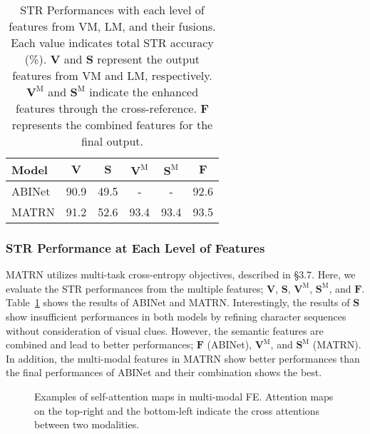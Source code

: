 \documentclass[runningheads]{llncs}
\begin{document}
\begin{table}[t]
\caption{STR Performances with each level of features from VM, LM, and their fusions. Each value indicates total STR accuracy (\%). $\mathbf{V}$ and $\mathbf{S}$ represent the output features from VM and LM, respectively. $\mathbf{V}^\text{M}$ and $\mathbf{S}^\text{M}$ indicate the enhanced features through the cross-reference. $\mathbf{F}$ represents the combined features for the final output.}
\small
\tabcolsep=0.2cm
\label{tab:final_prediction}
\centering
\begin{centering}
\begin{tabular}{l|cc|cc|c}
\toprule
Model & $\mathbf{V}$ & $\mathbf{S}$ & $\mathbf{V}^\text{M}$ & $\mathbf{S}^\text{M}$ & $\mathbf{F}$ \\
\midrule
ABINet & 90.9 & 49.5 & - & - & 92.6 \\
MATRN & 91.2 & 52.6 & 93.4 & 93.4 & 93.5 \\
\bottomrule
\end{tabular}
\end{centering}
\end{table}

\subsubsection{STR Performance at Each Level of Features}
MATRN utilizes multi-task cross-entropy objectives, described in \S3.7. Here, we evaluate the STR performances from the multiple features; $\mathbf{V}$, $\mathbf{S}$, $\mathbf{V}^\text{M}$, $\mathbf{S}^\text{M}$, and $\mathbf{F}$. Table~\ref{tab:final_prediction} shows the results of ABINet and MATRN. Interestingly, the results of $\mathbf{S}$ show insufficient performances in both models by refining character sequences without consideration of visual clues. However, the semantic features are combined and lead to better performances; $\mathbf{F}$ (ABINet), $\mathbf{V}^\text{M}$, and $\mathbf{S}^\text{M}$ (MATRN). In addition, the multi-modal features in MATRN show better performances than the final performances of ABINet and their combination shows the best. 

\begin{figure}[t]
\centering
    \caption{Examples of self-attention maps in multi-modal FE. Attention maps on the top-right and the bottom-left indicate the cross attentions between two modalities.}
    \label{fig:attn_map}
\end{figure}
\end{document}
